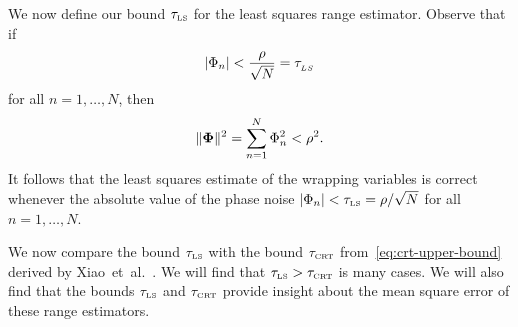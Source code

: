 We now define our bound $\tau_{\text{\tiny{LS}}}$ for the least squares range estimator.  Observe that if
\begin{equation}\label{eq:robust-reconstruction_criterion}
\left\vert \Phi_n \right\vert < \frac{\rho}{\sqrt{N}} = \tau_{_{LS}}
\end{equation}
for all $n = 1, \ldots, N$, then
\[
\|\boldsymbol{\Phi} \|^2 = \sum_{n = 1}^N \Phi_n^2 < \rho^2.
\]
It follows that the least squares estimate of the wrapping variables is correct whenever the absolute value of the phase noise $\left\vert \Phi_n \right\vert < \tau_{\text{\tiny{LS}}} = \rho/\sqrt{N}$ for all $n = 1, \dots, N$.

We now compare the bound $\tau_{\text{\tiny{LS}}}$ with the bound $\tau_{\text{\tiny{CRT}}}$ from~\ref{eq:crt-upper-bound} derived by Xiao~et~al.~\cite{Xiao_multistage_crt_2014}.  We will find that $\tau_{\text{\tiny{LS}}} > \tau_{\text{\tiny{CRT}}}$ is many cases.  We will also find that the bounds $\tau_{\text{\tiny{LS}}}$ and $\tau_{\text{\tiny{CRT}}}$ provide insight about the mean square error of these range estimators.



